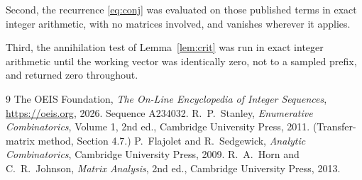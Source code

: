 \documentclass[11pt,a4paper]{article}
\theoremstyle{plain}
\theoremstyle{definition}
\begin{document}
Second, the recurrence \eqref{eq:conj} was evaluated on those published terms in exact
integer arithmetic, with no matrices involved, and vanishes wherever it applies.

Third, the annihilation test of Lemma~\ref{lem:crit} was run in exact integer arithmetic
until the working vector was identically zero, not to a sampled prefix, and returned zero
throughout.

\begin{thebibliography}{9}
 The OEIS Foundation, \emph{The On-Line Encyclopedia of Integer
Sequences}, \url{https://oeis.org}, 2026. Sequence A234032.
 R.~P.~Stanley, \emph{Enumerative Combinatorics}, Volume 1, 2nd ed.,
Cambridge University Press, 2011. (Transfer-matrix method, Section 4.7.)
 P.~Flajolet and R.~Sedgewick, \emph{Analytic Combinatorics}, Cambridge
University Press, 2009.
 R.~A.~Horn and C.~R.~Johnson, \emph{Matrix Analysis}, 2nd ed., Cambridge
University Press, 2013.
\end{thebibliography}
\end{document}
